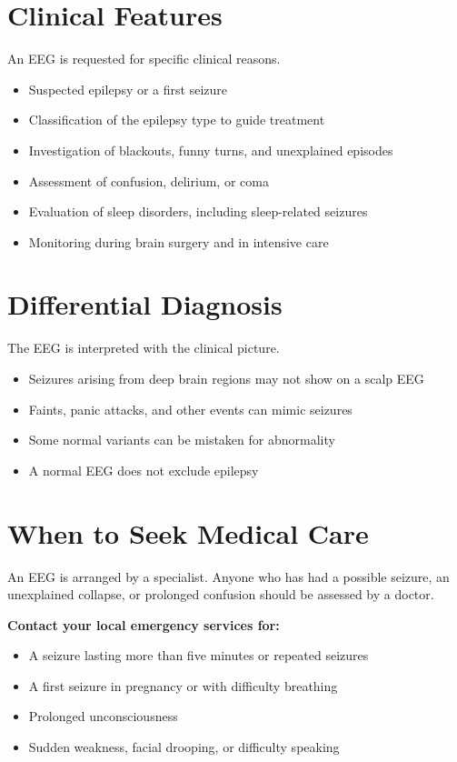 \section*{Clinical Features}
An EEG is requested for specific clinical reasons.
\begin{itemize}
    \item Suspected epilepsy or a first seizure
    \item Classification of the epilepsy type to guide treatment
    \item Investigation of blackouts, funny turns, and unexplained episodes
    \item Assessment of confusion, delirium, or coma
    \item Evaluation of sleep disorders, including sleep-related seizures
    \item Monitoring during brain surgery and in intensive care
\end{itemize}

\section*{Differential Diagnosis}
The EEG is interpreted with the clinical picture.
\begin{itemize}
    \item Seizures arising from deep brain regions may not show on a scalp EEG
    \item Faints, panic attacks, and other events can mimic seizures
    \item Some normal variants can be mistaken for abnormality
    \item A normal EEG does not exclude epilepsy
\end{itemize}

\section*{When to Seek Medical Care}
An EEG is arranged by a specialist. Anyone who has had a possible seizure, an unexplained collapse, or prolonged confusion should be assessed by a doctor.

\textbf{Contact your local emergency services for:}
\begin{itemize}
    \item A seizure lasting more than five minutes or repeated seizures
    \item A first seizure in pregnancy or with difficulty breathing
    \item Prolonged unconsciousness
    \item Sudden weakness, facial drooping, or difficulty speaking
\end{itemize}

